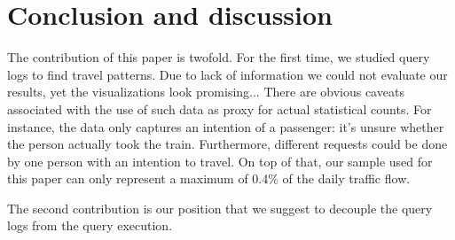 \documentclass{sig-alternate}
\begin{document}
\section{Conclusion and discussion}
\label{sec:conclusion}

The contribution of this paper is twofold.
For the first time, we studied query logs to find travel patterns.
Due to lack of information we could not evaluate our results, yet the visualizations look promising...
There are obvious caveats associated with the use of such data as proxy for actual statistical counts. 
For instance, the data only captures an intention of a passenger: it's unsure whether the person actually took the train.
Furthermore, different requests could be done by one person with an intention to travel.
On top of that, our sample used for this paper can only represent a maximum of 0.4\% of the daily traffic flow.

The second contribution is our position that we suggest to decouple the query logs from the query execution.

\let\oldsection\section
\renewcommand{\section}[2][1]{\oldsection{#1}\vspace{-3pt}}



\end{document}
